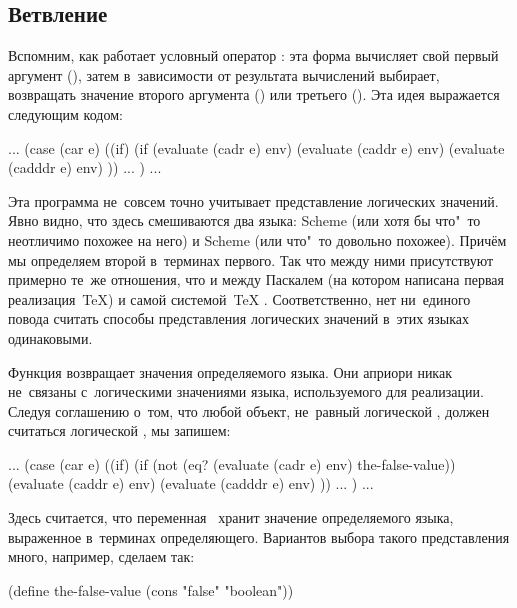 \subsection{Ветвление}\label{basics/evaluating-forms/ssect:alternatives}

Вспомним, как работает условный оператор : эта форма вычисляет свой
первый аргумент (), затем в~зависимости от результата вычислений
выбирает, возвращать значение второго аргумента () или третьего
(). Эта идея выражается следующим кодом:

\begin{code:lisp}
... (case (car e)
      ((if) (if (evaluate (cadr e) env)
                (evaluate (caddr e) env)
                (evaluate (cadddr e) env) )) ... ) ...
\end{code:lisp}

Эта программа не~совсем точно учитывает представление логических значений. Явно
видно, что здесь смешиваются два языка: Scheme (или хотя бы что"~то неотличимо
похожее на него) и Scheme (или что"~то довольно похожее). Причём мы определяем
второй в~терминах первого. Так что между ними присутствуют примерно те~же
отношения, что и между Паскалем (на котором написана первая реализация~\TeX) и
самой системой~{\TeX} \cite{knu84}. Соответственно, нет ни~единого повода
считать способы представления логических значений в~этих языках одинаковыми.

Функция  возвращает значения определяемого языка. Они априори никак
не~связаны с~логическими значениями языка, используемого для реализации. Следуя
соглашению о~том, что любой объект, не~равный логической , должен
считаться логической , мы запишем:

\begin{code:lisp}
... (case (car e)
      ((if) (if (not (eq? (evaluate (cadr e) env) the-false-value))
                (evaluate (caddr e) env)
                (evaluate (cadddr e) env) )) ... ) ...
\end{code:lisp}

Здесь считается, что переменная~ хранит значение 
определяемого языка, выраженное в~терминах определяющего. Вариантов выбора
такого представления много, например, сделаем так:

\begin{code:lisp}
(define the-false-value (cons "false" "boolean"))
\end{code:lisp}

